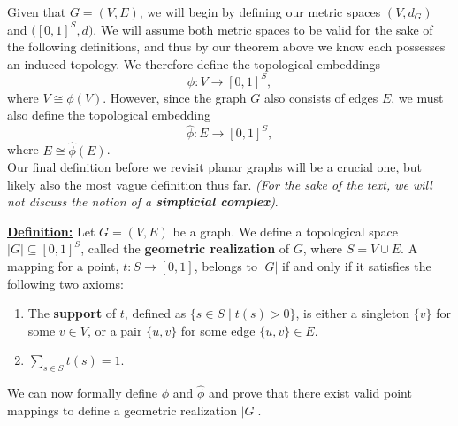 \documentclass{article}
\begin{document}
\noindent Given that $G = (V,E)$, we will begin by defining our metric spaces $(V, d_{G})$ and $\bigl([0,1]^{S}, d\bigr)$. We will assume both metric spaces to be valid for the sake of the following definitions, and thus by our theorem above we know each possesses an induced topology. We therefore define the topological embeddings\\
\[\phi: V \to [0,1]^{S},\]
where $V \cong \phi(V)$. However, since the graph $G$ also consists of edges $E$, we must also define the topological embedding 
\[\widehat\phi:E\to [0,1]^{S},\]
where $E \cong \widehat\phi(E)$.\\

\noindent Our final definition before we revisit planar graphs will be a crucial one, but likely also the most vague definition thus far. \textit{(For the sake of the text, we will not discuss the notion of a \textbf{simplicial complex})}.\\

\begin{graybox}
\noindent\underline{\textbf{Definition:}}  
Let $G = (V, E)$ be a graph. We define a topological space $|G|\subseteq [0,1]^{S}$, called the \textbf{geometric realization} of $G$, where $S = V\cup E$. A mapping for a point, $t : S \to [0,1]$, belongs to $|G|$ if and only if it satisfies the following two axioms:
\begin{enumerate}[label=(\roman*)]
    \item The \textbf{support} of \( t \), defined as \( \{s \in S \mid t(s) > 0\} \), is either a singleton \( \{v\} \) for some \( v \in V \), or a pair \( \{u,v\} \) for some edge \( \{u,v\} \in E \).
    \item \( \displaystyle\sum_{s \in S} t(s) = 1 \).
\end{enumerate}
\end{graybox}

\noindent We can now formally define $\phi$ and $\widehat{\phi}$ and prove that there exist valid point mappings to define a geometric realization $|G|$.\\
\end{document}
